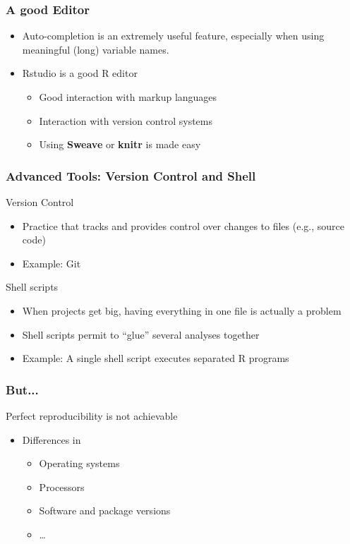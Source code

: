 \documentclass[paper=screen,mathserif]{beamer}\usepackage[]{graphicx}\usepackage[]{color}
\begin{document}
\begin{frame}
  \frametitle{A good Editor}
  \begin{itemize}
  \item Auto-completion is an extremely useful feature, especially
    when using meaningful (long) variable names.
  \item Rstudio is a good R editor
    \begin{itemize}
    \item Good interaction with markup languages
    \item Interaction with version control systems
    \item Using {\bf Sweave} or {\bf knitr} is made easy
    \end{itemize}
  \end{itemize}
\end{frame}

\begin{frame}
  \frametitle{Advanced Tools: Version Control and Shell}
  Version Control
  \begin{itemize}
  \item Practice that tracks and provides control over changes to
    files (e.g., source code)
  \item Example: Git
  \end{itemize}
  Shell scripts
  \begin{itemize}
  \item When projects get big, having everything in one file is
    actually a problem
  \item Shell scripts permit to ``glue'' several analyses together
  \item Example: A single shell script executes separated R programs
  \end{itemize}
\end{frame}

\begin{frame}
  \frametitle{But...}
  Perfect reproducibility is not achievable
  \begin{itemize}
  \item Differences in
    \begin{itemize}
    \item Operating systems
    \item Processors
    \item Software and package versions
    \item \dots
    \end{itemize}
  \end{itemize}
\end{frame}
\end{document}
